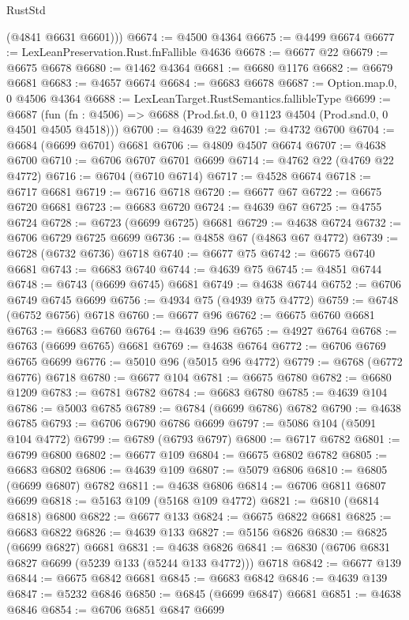 \begin{lexlean}{RustStd}
\begin{coremodule}
        (@4841 @6631 @6601)))
@6674 := @4500 @4364
@6675 := @4499 @6674
@6677 := LexLeanPreservation.Rust.fnFallible @4636
@6678 := @6677 @22
@6679 := @6675 @6678
@6680 := @1462 @4364
@6681 := @6680 @1176
@6682 := @6679 @6681
@6683 := @4657 @6674
@6684 := @6683 @6678
@6687 := Option.map.{0, 0} @4506 @4364
@6688 := LexLeanTarget.RustSemantics.fallibleType
@6699 := @6687
    (fun (fn : @4506) => @6688 (Prod.fst.{0, 0} @1123 @4504 (Prod.snd.{0, 0} @4501 @4505 @4518)))
@6700 := @4639 @22
@6701 := @4732 @6700
@6704 := @6684 (@6699 @6701) @6681
@6706 := @4809 @4507 @6674
@6707 := @4638 @6700
@6710 := @6706 @6707 @6701 @6699
@6714 := @4762 @22 (@4769 @22 @4772)
@6716 := @6704 (@6710 @6714)
@6717 := @4528 @6674
@6718 := @6717 @6681
@6719 := @6716 @6718
@6720 := @6677 @67
@6722 := @6675 @6720 @6681
@6723 := @6683 @6720
@6724 := @4639 @67
@6725 := @4755 @6724
@6728 := @6723 (@6699 @6725) @6681
@6729 := @4638 @6724
@6732 := @6706 @6729 @6725 @6699
@6736 := @4858 @67 (@4863 @67 @4772)
@6739 := @6728 (@6732 @6736) @6718
@6740 := @6677 @75
@6742 := @6675 @6740 @6681
@6743 := @6683 @6740
@6744 := @4639 @75
@6745 := @4851 @6744
@6748 := @6743 (@6699 @6745) @6681
@6749 := @4638 @6744
@6752 := @6706 @6749 @6745 @6699
@6756 := @4934 @75 (@4939 @75 @4772)
@6759 := @6748 (@6752 @6756) @6718
@6760 := @6677 @96
@6762 := @6675 @6760 @6681
@6763 := @6683 @6760
@6764 := @4639 @96
@6765 := @4927 @6764
@6768 := @6763 (@6699 @6765) @6681
@6769 := @4638 @6764
@6772 := @6706 @6769 @6765 @6699
@6776 := @5010 @96 (@5015 @96 @4772)
@6779 := @6768 (@6772 @6776) @6718
@6780 := @6677 @104
@6781 := @6675 @6780
@6782 := @6680 @1209
@6783 := @6781 @6782
@6784 := @6683 @6780
@6785 := @4639 @104
@6786 := @5003 @6785
@6789 := @6784 (@6699 @6786) @6782
@6790 := @4638 @6785
@6793 := @6706 @6790 @6786 @6699
@6797 := @5086 @104 (@5091 @104 @4772)
@6799 := @6789 (@6793 @6797)
@6800 := @6717 @6782
@6801 := @6799 @6800
@6802 := @6677 @109
@6804 := @6675 @6802 @6782
@6805 := @6683 @6802
@6806 := @4639 @109
@6807 := @5079 @6806
@6810 := @6805 (@6699 @6807) @6782
@6811 := @4638 @6806
@6814 := @6706 @6811 @6807 @6699
@6818 := @5163 @109 (@5168 @109 @4772)
@6821 := @6810 (@6814 @6818) @6800
@6822 := @6677 @133
@6824 := @6675 @6822 @6681
@6825 := @6683 @6822
@6826 := @4639 @133
@6827 := @5156 @6826
@6830 := @6825 (@6699 @6827) @6681
@6831 := @4638 @6826
@6841 := @6830 (@6706 @6831 @6827 @6699 (@5239 @133 (@5244 @133 @4772))) @6718
@6842 := @6677 @139
@6844 := @6675 @6842 @6681
@6845 := @6683 @6842
@6846 := @4639 @139
@6847 := @5232 @6846
@6850 := @6845 (@6699 @6847) @6681
@6851 := @4638 @6846
@6854 := @6706 @6851 @6847 @6699

\end{coremodule}
\end{lexlean}
